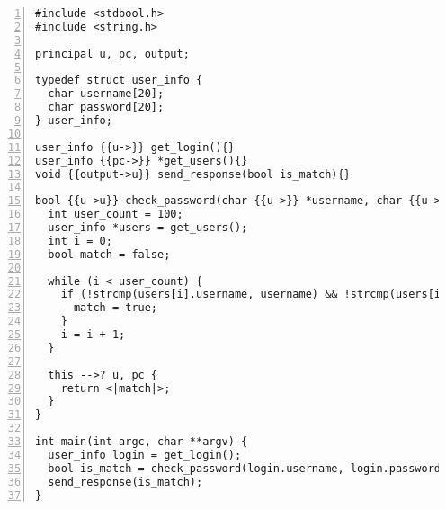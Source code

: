 \begin{lstlisting}[style=dlmc, numbers=left, caption={Inferred labeled password checker example}, label=example:code:check_password-explicit]
#include <stdbool.h>
#include <string.h>

principal u, pc, output;

typedef struct user_info {
  char username[20];
  char password[20];
} user_info;

user_info {{u->}} get_login(){}
user_info {{pc->}} *get_users(){}
void {{output->u}} send_response(bool is_match){}

bool {{u->u}} check_password(char {{u->}} *username, char {{u->}} *password) {
  int user_count = 100;
  user_info *users = get_users();
  int i = 0;
  bool match = false;

  while (i < user_count) {
    if (!strcmp(users[i].username, username) && !strcmp(users[i].password, password)) {
      match = true;
    }
    i = i + 1;
  }

  this -->? u, pc {
    return <|match|>;
  }
}

int main(int argc, char **argv) {
  user_info login = get_login();
  bool is_match = check_password(login.username, login.password);
  send_response(is_match);
}
\end{lstlisting}
